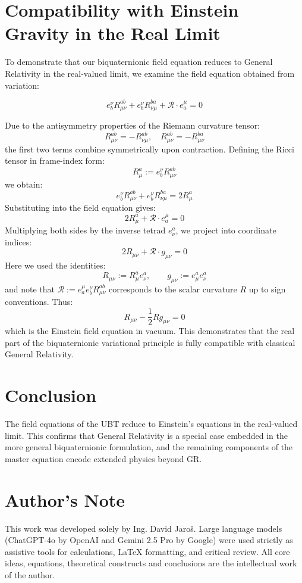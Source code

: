 \documentclass[11pt]{article}
\begin{document}
\section{Compatibility with Einstein Gravity in the Real Limit}

To demonstrate that our biquaternionic field equation reduces to General Relativity in the real-valued limit, we examine the field equation obtained from variation:

\[
e^\nu_b R_{\mu\nu}^{ab} + e^\nu_b R_{\nu\mu}^{ba} + \mathcal{R} \cdot e^\mu_a = 0
\]

Due to the antisymmetry properties of the Riemann curvature tensor:
\[
R_{\mu\nu}^{ab} = - R_{\nu\mu}^{ab}, \quad R_{\mu\nu}^{ab} = - R_{\mu\nu}^{ba}
\]
the first two terms combine symmetrically upon contraction. Defining the Ricci tensor in frame-index form:
\[
R^a_\mu := e^\nu_b R_{\mu\nu}^{ab}
\]
we obtain:
\[
e^\nu_b R_{\mu\nu}^{ab} + e^\nu_b R_{\nu\mu}^{ba} = 2 R^a_\mu
\]
Substituting into the field equation gives:
\[
2 R^a_\mu + \mathcal{R} \cdot e^\mu_a = 0
\]
Multiplying both sides by the inverse tetrad \( e^a_\nu \), we project into coordinate indices:
\[
2 R_{\mu\nu} + \mathcal{R} \cdot g_{\mu\nu} = 0
\]
Here we used the identities:
\[
R_{\mu\nu} := R^a_\mu e^a_\nu, \qquad g_{\mu\nu} := e^a_\mu e^a_\nu
\]
and note that \( \mathcal{R} := e^\mu_a e^\nu_b R_{\mu\nu}^{ab} \) corresponds to the scalar curvature \( R \) up to sign conventions. Thus:
\[
R_{\mu\nu} - \frac{1}{2} R g_{\mu\nu} = 0
\]
which is the Einstein field equation in vacuum. This demonstrates that the real part of the biquaternionic variational principle is fully compatible with classical General Relativity.


\section{Conclusion}
The field equations of the UBT reduce to Einstein's equations in the real-valued limit. This confirms that General Relativity is a special case embedded in the more general biquaternionic formulation, and the remaining components of the master equation encode extended physics beyond GR.


\section*{Author's Note}

This work was developed solely by Ing. David Jaroš.  
Large language models (ChatGPT-4o by OpenAI and Gemini 2.5 Pro by Google) were used strictly as assistive tools for calculations, LaTeX formatting, and critical review.  
All core ideas, equations, theoretical constructs and conclusions are the intellectual work of the author.
\end{document}

